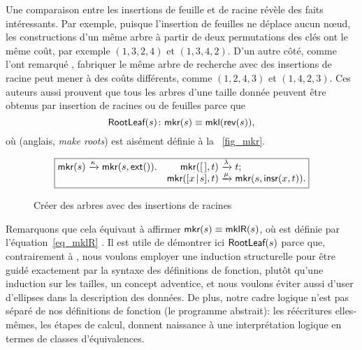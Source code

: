 Une comparaison entre les insertions de feuille et de racine révèle
des faits intéressants. Par exemple, puisque l'insertion de feuilles
ne déplace aucun n{\oe}ud, les constructions d'un même arbre à partir
de deux permutations des clés ont le même coût, par exemple
\((1,3,2,4)\) et \((1,3,4,2)\). D'un autre côté, comme l'ont remarqué
\cite{GeldenhuysVanderMerwe_2009}, fabriquer le même arbre de
recherche avec des insertions de racine peut mener à des coûts
différents, comme \((1,2,4,3)\) et \((1,4,2,3)\). Ces auteurs aussi
prouvent que tous les arbres d'une taille donnée peuvent être obtenus
par insertion de racines ou de feuilles parce que
\begin{equation}
\pred{RootLeaf}{s} \colon \fun{mkr}(s) \equiv \fun{mkl}(\fun{rev}(s)),
\label{thm_RootLeaf}
\index{RootLeaf@\predName{RootLeaf}}
\end{equation}
où  
(anglais, \emph{make roots}) est aisément définie à la
\fig~\vref{fig_mkr}.
\begin{figure}
\begin{equation*}
\boxed{
\begin{array}{@{}r@{\;}l@{\;}lr@{\;}l@{\;}l@{}}
\fun{mkr}(s) & \xrightarrow{\smash{\kappa}} &
\fun{mkr}(s,\fun{ext}()).
& \fun{mkr}(\el,t) & \xrightarrow{\smash{\lambda}} & t;\\
&&&\fun{mkr}(\cons{x}{s},t) & \xrightarrow{\smash{\mu}} & \fun{mkr}(s,\fun{insr}(x,t)).
\end{array}}
\end{equation*}
\caption{Créer des arbres avec des insertions de racines
\label{fig_mkr}}
\end{figure}
Remarquons que cela équivaut à affirmer \(\textsf{mkr}(s) \equiv
\textsf{mklR}(s)\), où  est définie par
l'équation~\eqref{eq_mklR} . Il est utile de
démontrer ici \(\textsf{RootLeaf}({s})\) parce que, contrairement à
\cite{GeldenhuysVanderMerwe_2009}, nous voulons employer une induction
structurelle pour être guidé exactement par la syntaxe des définitions
de fonction, plutôt qu'une induction sur les tailles, un concept
adventice, et nous voulons éviter aussi d'user d'ellipses dans la
description des données. De plus, notre cadre logique n'est pas séparé
de nos définitions de fonction (le programme abstrait): les
réécritures elles-mêmes, les étapes de calcul, donnent naissance à
une interprétation logique en termes de classes d'équivalences.

